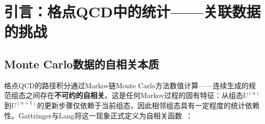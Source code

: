 \documentclass[12pt,a4paper]{ctexart}
\theoremstyle{definition}
\begin{document}
\begin{abstract}
\textbf{第四层——Jackknife（刀切法）（§4）：}
与Bootstrap互补的方法——从$N$个数据中\textbf{逐个剔除}第$n$个，形成$N$个大小为$N-1$的子集。每个子集计算的$\theta_n$值用于估计方差：$\sigma^2_{\hat\theta} = \frac{N-1}{N}\sum_n(\theta_n - \hat\theta)^2$（Gattringer \& Lang的公式(4.72)）。Jackknife与Bootstrap的视角差异：Bootstrap适合大样本（$K$可自由选择）、提供偏差（bias）的直接估计、但对``尖峰''观测量（如中位数）可能不稳定；Jackknife是确定性的（无需随机性）、对$N$较小时方差估计更稳健、但在非线性观测量上偏差可能较大。

\textbf{第五层——关联数据的$\chi^2$拟合与协方差矩阵（§5）：}
当观测量是关联函数的指数拟合（如从$C(t) = A_0 e^{-E_0 t}$中提取基态质量）时，拟合的可靠性取决于协方差矩阵$\text{Cov}(t, t')$的正确处理。给出关联$\chi^2$拟合的完整定义：$\chi^2 = \sum_{t,t'}[C(t)-f(t)]\,\text{Cov}^{-1}(t,t')\,[C(t')-f(t')]$，其中$\text{Cov}(t,t')$从$N$个组态上的关联函数测量值中估计。讨论在数据量不足定时协方差矩阵的奇异性和正则化策略（如仅使用对角部分、平滑近似、或截断奇异值分解）。

\textbf{第六层——NNPDF的Monte Carlo Replica方法（§6）：}
以NNPDF4.0的PDF拟合为Bootstrap理念在大规模数据分析中的拓展实例。NNPDF使用\textbf{Monte Carlo Replica}方法——在原始实验数据的协方差矩阵中生成人工的``伪数据''副本（通过多变量Gaussian抽样），对每个replica独立训练神经网络以拟合PDF。1000个replica的结果分布自然地给出PDF的中心值（平均）和误差带（标准差）——这是Bootstrap思想在``数据重采样+模型重训练''范式下的直接推广。
\end{abstract}

\tableofcontents
\newpage

\section{引言：格点QCD中的统计——关联数据的挑战}

\subsection{Monte Carlo数据的自相关本质}

格点QCD的路径积分通过Markov链Monte Carlo方法数值计算——连续生成的规范组态之间存在\textbf{不可约的自相关}。这是任何Markov过程的固有特征：从组态$U^{(n)}$到$U^{(n+1)}$的更新步骤仅依赖于当前组态，因此相邻组态具有一定程度的统计依赖性。Gattringer与Lang将这一现象正式定义为自相关函数~\cite{GattringerLang2010}：
\end{document}

